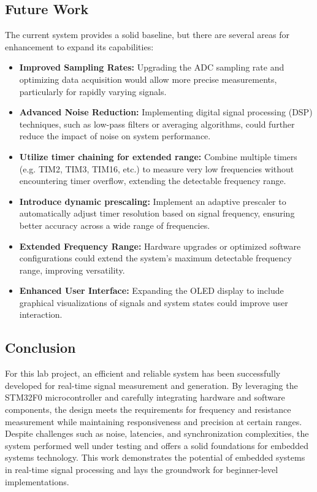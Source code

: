 \subsection{Future Work}
The current system provides a solid baseline, but there are several areas for enhancement to expand its capabilities:
\begin{itemize}[leftmargin=2em]
    \item \textbf{Improved Sampling Rates:} Upgrading the ADC sampling rate and optimizing data acquisition would allow more precise measurements, particularly for rapidly varying signals.
    \item \textbf{Advanced Noise Reduction:} Implementing digital signal processing (DSP) techniques, such as low-pass filters or averaging algorithms, could further reduce the impact of noise on system performance.
    \item \textbf{Utilize timer chaining for extended range:} Combine multiple timers (e.g. TIM2, TIM3, TIM16, etc.) to measure very low frequencies without encountering timer overflow, extending the detectable frequency range.
    \item \textbf{Introduce dynamic prescaling:} Implement an adaptive prescaler to automatically adjust timer resolution based on signal frequency, ensuring better accuracy across a wide range of frequencies.
    \item \textbf{Extended Frequency Range:} Hardware upgrades or optimized software configurations could extend the system's maximum detectable frequency range, improving versatility.
    \item \textbf{Enhanced User Interface:} Expanding the OLED display to include graphical visualizations of signals and system states could improve user interaction.
\end{itemize}

\subsection{Conclusion}
For this lab project, an efficient and reliable system has been successfully developed for real-time signal measurement and generation. By leveraging the STM32F0 microcontroller and carefully integrating hardware and software components, the design meets the requirements for frequency and resistance measurement while maintaining responsiveness and precision at certain ranges. Despite challenges such as noise, latencies, and synchronization complexities, the system performed well under testing and offers a solid foundations for embedded systems technology. This work demonstrates the potential of embedded systems in real-time signal processing and lays the groundwork for beginner-level implementations.
